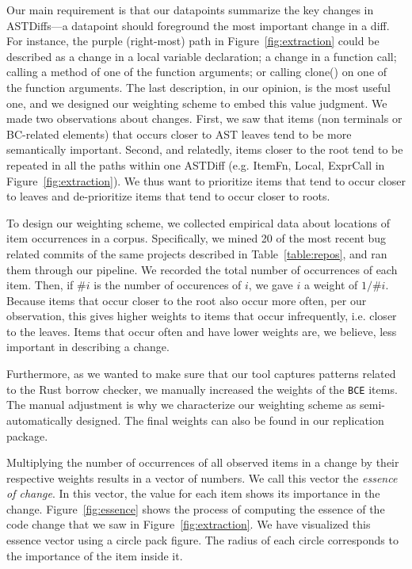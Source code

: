 Our main requirement is that our datapoints summarize the key changes in ASTDiffs---a datapoint should foreground the most important change in a diff. For instance, the purple (right-most) path in Figure~\ref{fig:extraction} could be described as a change in a local variable declaration; a change in a function call; calling a method of one of the function arguments; or calling clone() on one of the function arguments. The last description, in our opinion, is the most useful one, and we designed our weighting scheme to embed this value judgment.
We made two observations about changes. First, we saw that items (non terminals or BC-related elements) that occurs closer to AST leaves tend to be more semantically important. Second, and relatedly, items closer to the root tend to be repeated in all the paths within one ASTDiff (e.g. ItemFn, Local, ExprCall in Figure~\ref{fig:extraction}). We thus want to prioritize items that tend to occur closer to leaves and de-prioritize items that tend to occur closer to roots.

To design our weighting scheme, we collected empirical data about locations of item occurrences in a corpus. Specifically, we mined 20 of the most recent bug related commits of the same projects described in Table~\ref{table:repos}, and ran them through our pipeline. We recorded the total number of occurrences of each item. Then, if $\# i$ is the number of occurences of $i$, we gave $i$ a weight of $1/\# i$. Because items that occur closer to the root also occur more often, per our observation, this gives higher weights to items that occur infrequently, i.e. closer to the leaves. Items that occur often and have lower weights are, we believe, less important in describing a change.

Furthermore, as we wanted to make sure that our tool captures patterns related to the Rust borrow checker, we manually increased the weights of the \texttt{BCE} items. The manual adjustment is why we characterize our weighting scheme as semi-automatically designed. The final weights can also be found in our replication package.

Multiplying the number of occurrences of all observed items in a change by their respective weights results in a vector of numbers. We call this vector the \emph{essence of change}. In this vector, the value for each item shows its importance in the change. Figure~\ref{fig:essence} shows the process of computing the essence of the code change that we saw in Figure~\ref{fig:extraction}. We have visualized this essence vector using a circle pack figure. The radius of each circle corresponds to the importance of the item inside it.

